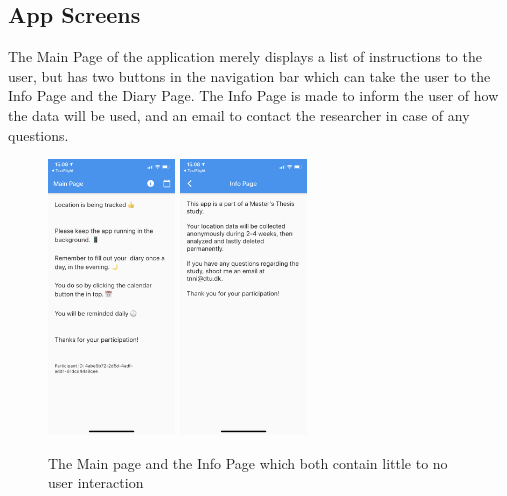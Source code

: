 \subsection{App Screens}
The Main Page of the application merely displays a list of instructions to the user, but has two buttons in the navigation bar which can take the user to the Info Page and the Diary Page. The Info Page is made to inform the user of how the data will be used, and an email to contact the researcher in case of any questions.

\begin{figure}
    \centering
    \includegraphics[width=0.3\textwidth]{images/app_imgs/app_mainpage.png} \includegraphics[width=0.3\textwidth]{images/app_imgs/app_infopage.png}
    \caption{The Main page and the Info Page which both contain little to no user interaction}
    \label{fig:my_label}
\end{figure}

